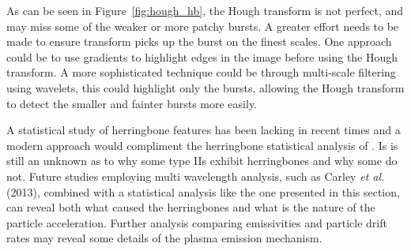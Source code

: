 As can be seen in Figure~\ref{fig:hough_hb}, the Hough transform is not perfect, and may miss some of the weaker or more patchy bursts. A greater effort needs to be made to ensure transform picks up the burst on the finest scales. One approach could be to use gradients to highlight edges in the image before using the Hough transform. A more sophisticated technique could be through multi-scale filtering using wavelets, this could highlight only the bursts, allowing the Hough transform to detect the smaller and fainter bursts more easily.

A statistical study of herringbone features has been lacking in recent times and a modern approach would compliment the herringbone statistical analysis of \citep{cairns1987, mann1995}. Is is still an unknown as to why some type IIs exhibit herringbones and why some do not. Future studies employing multi wavelength analysis, such as Carley {\it et al.}\,(2013), combined with a statistical analysis like the one presented in this section, can reveal both what caused the herringbones and what is the nature of the particle acceleration. Further analysis comparing emissivities and particle drift rates may reveal some details of the plasma emission mechanism.




